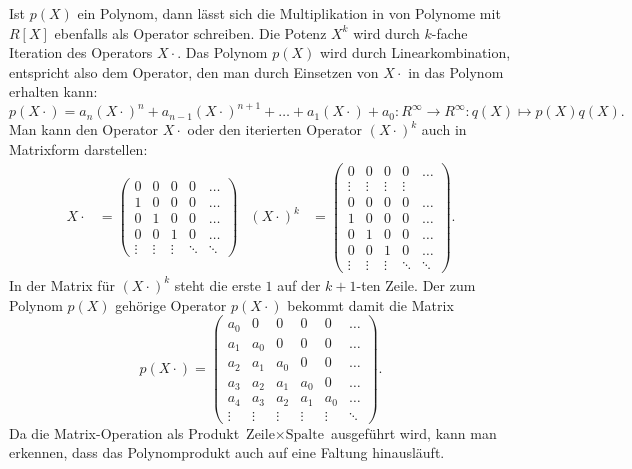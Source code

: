 Ist $p(X)$ ein Polynom, dann lässt sich die Multiplikation
in von Polynome mit $R[X]$ ebenfalls als Operator schreiben.
Die Potenz $X^k$ wird durch $k$-fache Iteration des Operators
$X\cdot$.
Das Polynom $p(X)$ wird durch Linearkombination, entspricht
also dem Operator, den man durch Einsetzen von $X\cdot$
in das Polynom erhalten kann:
\[
p(X\cdot)
=
a_n(X\cdot)^n + a_{n-1}(X\cdot)^{n+1} + \dots + a_1(X\cdot) + a_0
\colon
R^\infty \to R^\infty
:
q(X) 
\mapsto
p(X)q(X).
\]
Man kann den Operator $X\cdot$ oder den iterierten Operator
$(X\cdot)^k$ auch in Matrixform darstellen:
\begin{align*}
{X\cdot}
&=
\begin{pmatrix}
0&0&0&0&\dots\\
1&0&0&0&\dots\\
0&1&0&0&\dots\\
0&0&1&0&\dots\\
\vdots&\vdots&\vdots&\ddots&\ddots
\end{pmatrix}
&
(X\cdot)^k
&=
\begin{pmatrix}
  0   &  0   &  0   &  0   &\dots\\
\vdots&\vdots&\vdots&\vdots&     \\
  0   &  0   &  0   &  0   &\dots\\
  1   &  0   &  0   &  0   &\dots\\
  0   &  1   &  0   &  0   &\dots\\
  0   &  0   &  1   &  0   &\dots\\
\vdots&\vdots&\vdots&\ddots&\ddots
\end{pmatrix}.
\end{align*}
In der Matrix für $(X\cdot)^k$ steht die erste $1$ auf der
$k+1$-ten Zeile.
Der zum Polynom $p(X)$ gehörige Operator $p(X\cdot)$ bekommt
damit die Matrix
\[
p(X\cdot)
=
\begin{pmatrix}
a_0    & 0     &  0   &  0   &  0   & \dots  \\
a_1    &a_0    &  0   &  0   &  0   & \dots  \\
a_2    &a_1    & a_0  &  0   &  0   & \dots  \\
a_3    &a_2    & a_1  & a_0  &  0   & \dots  \\
a_4    &a_3    & a_2  & a_1  & a_0  & \dots  \\
\vdots &\vdots &\vdots&\vdots&\vdots&\ddots
\end{pmatrix}.
\]
Da die Matrix-Operation als Produkt
$\text{Zeile}\times\text{Spalte}$ ausgeführt wird,
kann man erkennen, dass das Polynomprodukt auch auf
eine Faltung hinausläuft.

